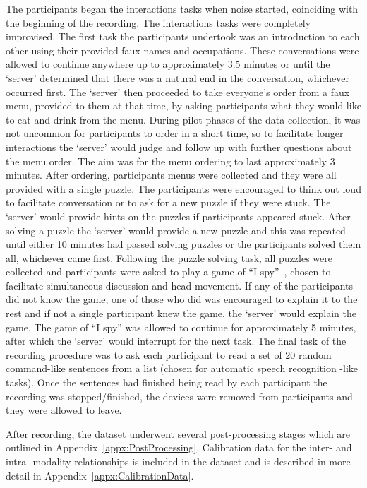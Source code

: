\documentclass[journal]{IEEEtran}
\begin{document}
The participants began the interactions tasks when noise started, coinciding with the beginning of the recording.
The interactions tasks were completely improvised.
The first task the participants undertook was an introduction to each other using their provided faux names and occupations.
These conversations were allowed to continue anywhere up to approximately 3.5 minutes or until the `server' determined that there was a natural end in the conversation, whichever occurred first.
The `server' then proceeded to take everyone's order from a faux menu, provided to them at that time, by asking participants what they would like to eat and drink from the menu.
During pilot phases of the data collection, it was not uncommon for participants to order in a short time, so to facilitate longer interactions the `server' would judge and follow up with further questions about the menu order.
The aim was for the menu ordering to last approximately 3 minutes.
After ordering, participants menus were collected and they were all provided with a single puzzle.
The participants were encouraged to think out loud to facilitate conversation or to ask for a new puzzle if they were stuck.
The `server' would provide hints on the puzzles if participants appeared stuck.
After solving a puzzle the `server' would provide a new puzzle and this was repeated until either 10 minutes had passed solving puzzles or the participants solved them all, whichever came first.
Following the puzzle solving task, all puzzles were collected and participants were asked to play a game of ``I spy''~\cite{}, chosen to facilitate simultaneous discussion and head movement.
If any of the participants did not know the game, one of those who did was encouraged to explain it to the rest and if not a single participant knew the game, the `server' would explain the game.
The game of ``I spy'' was allowed to continue for approximately 5 minutes, after which the `server' would interrupt for the next task.
The final task of the recording procedure was to ask each participant to read a set of 20 random command-like sentences from a list (chosen for automatic speech recognition -like tasks).
Once the sentences had finished being read by each participant the recording was stopped/finished, the devices were removed from participants and they were allowed to leave.

After recording, the dataset underwent several post-processing stages which are outlined in Appendix~\ref{appx:PostProcessing}.
Calibration data for the inter- and intra- modality relationships is included in the dataset and is described in more detail in Appendix~\ref{appx:CalibrationData}.
\end{document}
